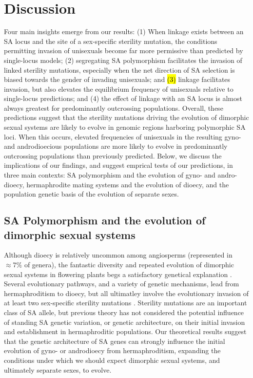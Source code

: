 \documentclass[9pt,twocolumn,twoside,lineno]{gsajnl}
\begin{document}
\section{Discussion}

Four main insights emerge from our results: (1) When linkage exists between an SA locus and the site of a sex-specific sterility mutation, the conditions permitting invasion of unisexuals become far more permissive than predicted by single-locus models; (2) segregating SA polymorphism facilitates the invasion of linked sterility mutations, especially when the net direction of SA selection is biased towards the gender of invading unisexuals; and \hl{(3)} linkage facilitates invasion, but also elevates the equilibrium frequency of unisexuals relative to single-locus predictions; and (4) the effect of linkage with an SA locus is almost always greatest for predominantly outcrossing populations. Overall, these predictions suggest that the sterility mutations driving the evolution of dimorphic sexual systems are likely to evolve in genomic regions harboring polymorphic SA loci. When this occurs, elevated frequencies of unisexuals in the resulting gyno- and androdioecious populations are more likely to evolve in predominantly outcrossing populations than previously predicted. Below, we discuss the implications of our findings, and suggest emprical tests of our predictions, in three main contexts: SA polymorphism and the evolution of gyno- and andro-dioecy, hermaphrodite mating systems and the evolution of dioecy, and the population genetic basis of the evolution of separate sexes.


\subsection{SA Polymorphism and the evolution of dimorphic sexual systems}

Although dioecy is relatively uncommon among angiosperms (represented in $\approx 7\%$ of genera), the fantastic diversity and repeated evolution of dimorphic sexual systems in flowering plants begs a satisfactory genetical explanation \citep{Renner2014,KaferPannell2017}. Several evolutionary pathways, and a variety of genetic mechanisms, lead from hermaphroditism to dioecy, but all ultimatley involve the evolutionary invasion of at least two sex-specific sterility mutations \citep{Charlesworth1978a,Charlesworth1978b,Renner2014,Ashman2015}. Sterility mutations are an important class of SA allele, but previous theory has not considered the potential influence of standing SA genetic variation, or genetic architecture, on their initial invasion and establishment in hermaphroditic populations. Our theoretical results suggest that the genetic architecture of SA genes can strongly influence the initial evolution of gyno- or androdioecy from hermaphroditism, expanding the conditions under which we should expect dimorphic sexual systems, and ultimately separate sexes, to evolve. 
\end{document}
